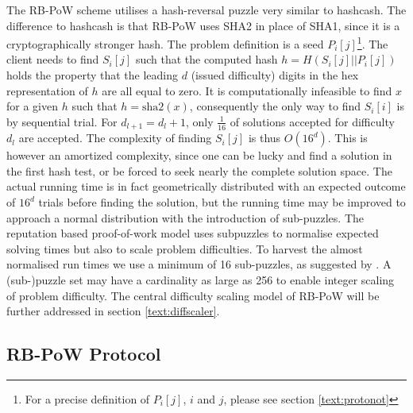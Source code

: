 The RB-PoW scheme utilises a hash-reversal puzzle very similar to hashcash. The difference to hashcash is that RB-PoW uses SHA2 in place of SHA1, since it is a cryptographically stronger hash.
The problem definition is a seed $P_i[j]$\footnote{For a precise definition of $P_i[j]$, $i$ and $j$, please see section \ref{text:protonot}}.
The client needs to find $S_i[j]$ such that the computed hash $ h = H(S_i[j]||P_i[j])$ holds the property that the leading $d$ (issued difficulty) digits in the hex representation of $h$ are all equal to zero. 
It is computationally infeasible to find $x$  for a given $h$ such that $ h = \mbox{sha2}(x)$\cite{sha2}, consequently the only way to find $S_i[i]$ is by sequential trial. For $d_{l+1} = d_l + 1 $, only $\frac{1}{16}$ of solutions accepted for difficulty $d_l$ are accepted.
The complexity of finding $S_i[j]$ is thus $O(16^d)$. This is however an amortized complexity, since one can be lucky and find a solution in the first hash test, or be forced to seek nearly the complete solution space.
The actual running time is in fact geometrically distributed with an expected outcome of $16^d$ trials before finding the solution, but the running time may be improved to approach a normal distribution with the introduction of sub-puzzles\cite{subpuzzles}. 
The reputation based proof-of-work model uses subpuzzles to normalise expected solving times but also to scale problem difficulties. To harvest the almost normalised run times we use a minimum of 16 sub-puzzles, as suggested by \citeauthor{subpuzzles}. A (sub-)puzzle set may have a cardinality as large as 256 to enable integer scaling of problem difficulty. The central difficulty scaling model of RB-PoW will be further addressed in section \ref{text:diffscaler}.

\subsection{RB-PoW Protocol}

